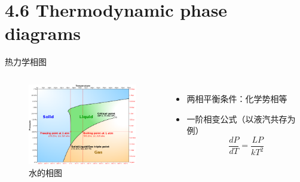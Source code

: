 \documentclass{ctexbeamer}
\begin{document}
\section{4.6 Thermodynamic phase diagrams}
\begin{frame}{热力学相图}  
    \begin{columns}
		\column{5cm}
		\begin{figure}
			\includegraphics[width=5cm]{phase_trans.png}
			\caption{水的相图}
		\end{figure}
		\column{5cm}
\begin{itemize}
    \item     两相平衡条件：化学势相等
    \item 一阶相变公式（以液汽共存为例）
\begin{equation}
    \frac{dP}{dT} = \frac{LP}{k T^2}
\end{equation}
\end{itemize}	
	\end{columns}
\end{frame}
\end{document}
